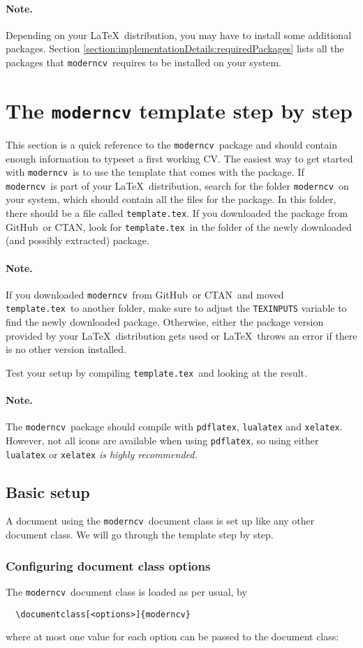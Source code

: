 \documentclass[a4paper, 11pt]{article}
\newcommand{\note}{\paragraph{Note.}}
\newcommand{\code}[1]{\lstinline!#1!}
\newcommand{\moderncv}{\code{moderncv}}
\newcommand{\Moderncv}{\moderncv~}
\newcommand{\github}{GitHub}
\newcommand{\Github}{\github~}
\newcommand{\ctan}{CTAN}
\newcommand{\Ctan}{\ctan~}
\newcommand{\cvtemplate}{\code{template.tex}}
\newcommand{\Cvtemplate}{\cvtemplate~}
\newcommand{\Latex}{\LaTeX~}
\begin{document}
\note Depending on your \Latex distribution, you may have to install some additional packages.
Section \ref{section:implementationDetails:requiredPackages} lists all the packages that \Moderncv requires to be installed on your system.



\section{The \texttt{moderncv} template step by step}
This section is a quick reference to the \Moderncv package and should contain enough information to typeset a first working CV.
\label{section:moderncvTemplate}
The easiest way to get started with \Moderncv is to use the template that comes with the package.
If \Moderncv is part of your \Latex distribution, search for the folder \Moderncv on your system, which should contain all the files for the package.
In this folder, there should be a file called \cvtemplate.
If you downloaded the package from \Github or \ctan, look for \Cvtemplate in the folder of the newly downloaded (and possibly extracted) package.

\note If you downloaded \Moderncv from \Github or \Ctan and moved \Cvtemplate to another folder, make sure to adjust the \code{TEXINPUTS} variable to find the newly downloaded package.
Otherwise, either the package version provided by your \Latex distribution gets used or \Latex throws an error if there is no other version installed.

Test your setup by compiling \Cvtemplate and looking at the result.

\note The \Moderncv package should compile with \code{pdflatex}, \code{lualatex} and \code{xelatex}.
However, not all icons are available when using \code{pdflatex}, so using either \code{lualatex} or \code{xelatex} \emph{is highly recommended.}

\subsection{Basic setup}
A document using the \Moderncv document class is set up like any other document class.
We will go through the template step by step.

\subsubsection*{Configuring document class options}
The \Moderncv document class is loaded as per usual, by
\begin{lstlisting}
  \documentclass[<options>]{moderncv}
\end{lstlisting}
where at most one value for each option can be passed to the document class:
\end{document}
